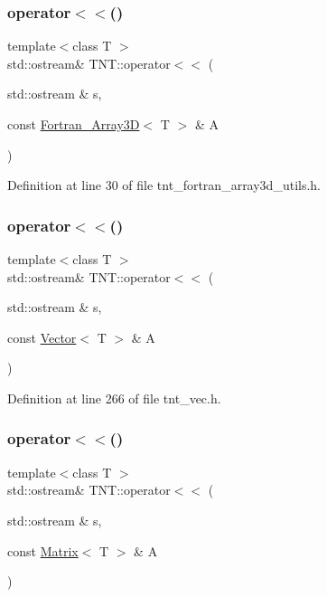 \subsubsection{\texorpdfstring{operator$<$$<$()}{operator<<()}\hspace{0.1cm}{\footnotesize\ttfamily [5/7]}}
{\footnotesize\ttfamily template$<$class T $>$ \\
std\+::ostream\& T\+N\+T\+::operator$<$$<$ (\begin{DoxyParamCaption}\item[{std\+::ostream \&}]{s,  }\item[{const \hyperlink{classTNT_1_1Fortran__Array3D}{Fortran\+\_\+\+Array3D}$<$ T $>$ \&}]{A }\end{DoxyParamCaption})}



Definition at line 30 of file tnt\+\_\+fortran\+\_\+array3d\+\_\+utils.\+h.

\mbox{\label{namespaceTNT_a20c2d998d51d92ef6a5f521c66bf8d0b}} 
\subsubsection{\texorpdfstring{operator$<$$<$()}{operator<<()}\hspace{0.1cm}{\footnotesize\ttfamily [6/7]}}
{\footnotesize\ttfamily template$<$class T $>$ \\
std\+::ostream\& T\+N\+T\+::operator$<$$<$ (\begin{DoxyParamCaption}\item[{std\+::ostream \&}]{s,  }\item[{const \hyperlink{classTNT_1_1Vector}{Vector}$<$ T $>$ \&}]{A }\end{DoxyParamCaption})}



Definition at line 266 of file tnt\+\_\+vec.\+h.

\mbox{\label{namespaceTNT_a35dd0a4b8055b08b5ff492b27691e77e}} 
\subsubsection{\texorpdfstring{operator$<$$<$()}{operator<<()}\hspace{0.1cm}{\footnotesize\ttfamily [7/7]}}
{\footnotesize\ttfamily template$<$class T $>$ \\
std\+::ostream\& T\+N\+T\+::operator$<$$<$ (\begin{DoxyParamCaption}\item[{std\+::ostream \&}]{s,  }\item[{const \hyperlink{classTNT_1_1Matrix}{Matrix}$<$ T $>$ \&}]{A }\end{DoxyParamCaption})}



